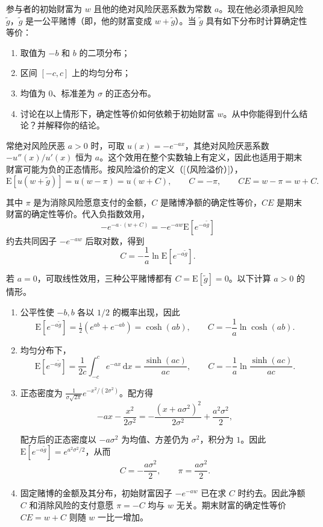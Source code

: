 \begin{problem}
 参与者的初始财富为 $w$ 且他的绝对风险厌恶系数为常数 $a$。现在他必须承担风险 $\tilde{g}$，$\tilde{g}$ 是一公平赌博（即，他的财富变成 $w+\tilde{g}$）。当 $\tilde{g}$ 具有如下分布时计算确定性等价：
\begin{enumerate}[label=(\alph*)]
    \item 取值为 $-b$ 和 $b$ 的二项分布；
    \item 区间 $[-c,c]$ 上的均匀分布；
    \item 均值为 0、标准差为 $\sigma$ 的正态分布。
    \item 讨论在以上情形下，确定性等价如何依赖于初始财富 $w$。从中你能得到什么结论？并解释你的结论。
\end{enumerate}
\end{problem}
\begin{solution}[blank-type=manual,blank-vsep=9\baselineskip]
常绝对风险厌恶 $a>0$ 时，可取 $u(x)=-e^{-ax}$，其绝对风险厌恶系数 $-u''(x)/u'(x)$ 恒为 $a$。这个效用在整个实数轴上有定义，因此也适用于期末财富可能为负的正态情形。按风险溢价的定义\ifdefined\WJHandoutKnowledge（[（风险溢价）]）\fi，
\[
 \mathrm E[u(w+\tilde g)]=u(w-\pi)=u(w+C),\qquad
 C=-\pi,\qquad CE=w-\pi=w+C.
\]

其中 $\pi$ 是为消除风险愿意支付的金额，$C$ 是赌博净额的确定性等价，$CE$ 是期末财富的确定性等价。代入负指数效用，
\[
 -e^{-a\cdot(w+C)}=-e^{-aw}\mathrm E[e^{-a\tilde g}]
\]
约去共同因子 $-e^{-aw}$ 后取对数，得到
\[
 C=-\frac1a\ln\mathrm E[e^{-a\tilde g}].
\]

若 $a=0$，可取线性效用，三种公平赌博都有 $C=\mathrm E[\tilde g]=0$。以下计算 $a>0$ 的情形。
\begin{enumerate}[label=(\alph*)]
\item 公平性使 $-b,b$ 各以 $1/2$ 的概率出现，因此
\[
 \mathrm E[e^{-a\tilde g}]=\tfrac12(e^{ab}+e^{-ab})=\cosh(ab),
 \qquad C=-\frac1a\ln\cosh(ab).
\]
\item 均匀分布下，
\[
 \mathrm E[e^{-a\tilde g}]=\frac1{2c}\int_{-c}^ce^{-ax}\,\mathrm dx
 =\frac{\sinh(ac)}{ac},\qquad
 C=-\frac1a\ln\frac{\sinh(ac)}{ac}.
\]
\item 正态密度为 $\frac1{\sigma\sqrt{2\pi}}e^{-x^2/(2\sigma^2)}$。配方得
\[
 -ax-\frac{x^2}{2\sigma^2}
 =-\frac{(x+a\sigma^2)^2}{2\sigma^2}+\frac{a^2\sigma^2}{2},
\]

配方后的正态密度以 $-a\sigma^2$ 为均值、方差仍为 $\sigma^2$，积分为 $1$。因此 $\mathrm E[e^{-a\tilde g}]=e^{a^2\sigma^2/2}$，从而
\[
 C=-\frac{a\sigma^2}{2},\qquad\pi=\frac{a\sigma^2}{2}.
\]
\item 固定赌博的金额及其分布，初始财富因子 $-e^{-aw}$ 已在求 $C$ 时约去。因此净额 $C$ 和消除风险的支付意愿 $\pi=-C$ 均与 $w$ 无关。期末财富的确定性等价 $CE=w+C$ 则随 $w$ 一比一增加。
\end{enumerate}
\end{solution}

